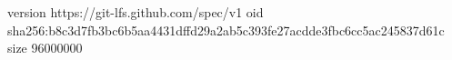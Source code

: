 version https://git-lfs.github.com/spec/v1
oid sha256:b8c3d7fb3bc6b5aa4431dffd29a2ab5c393fe27acdde3fbc6cc5ac245837d61c
size 96000000
